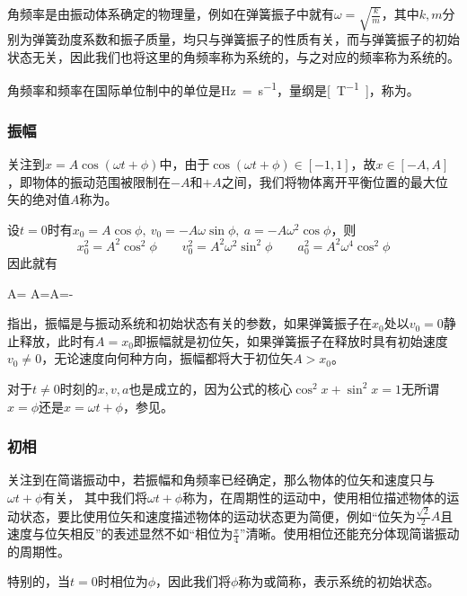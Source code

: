 角频率是由振动体系确定的物理量，例如在弹簧振子中就有$\omega=\sqrt{\frac{k}{m}}$，其中$k,m$分别为弹簧劲度系数和振子质量，均只与弹簧振子的性质有关，而与弹簧振子的初始状态无关，因此我们也将这里的角频率称为系统的，与之对应的频率称为系统的。

角频率和频率在国际单位制中的单位是\si{Hz=s^{-1}}，量纲是\si{[T^{-1}]}，称为。

\subsubsection{振幅}
关注到$x=A\cos(\omega t+\phi)$中，由于$\cos(\omega t+\phi)\in[-1,1]$，故$x\in[-A,A]$，即物体的振动范围被限制在$-A$和$+A$之间，我们将物体离开平衡位置的最大位矢的绝对值$A$称为。

设$t=0$时有$x_0=A\cos\phi,~v_0=-A\omega\sin\phi,~a=-A\omega^2\cos\phi$，则
\begin{equation*}
    x_0^2=A^2\cos^2\phi\qquad v_0^2=A^2\omega^2\sin^2\phi\qquad a_0^2=A^2\omega^4\cos^2\phi
\end{equation*}
因此就有
\begin{BoxEquation}[简谐振动的振幅]
    A=\qquad
    A=\qquad A=-
\end{BoxEquation}
指出，振幅是与振动系统和初始状态有关的参数，如果弹簧振子在$x_0$处以$v_0=0$静止释放，此时有$A=x_0$即振幅就是初位矢，如果弹簧振子在释放时具有初始速度$v_0\neq 0$，无论速度向何种方向，振幅都将大于初位矢$A>x_0$。

对于$t\neq 0$时刻的$x,v,a$也是成立的，因为公式的核心$\cos^2 x+\sin^2 x=1$无所谓$x=\phi$还是$x=\omega t+\phi$，参见。

\subsubsection{初相}
关注到在简谐振动中，若振幅和角频率已经确定，那么物体的位矢和速度只与$\omega t+\phi$有关， 其中我们将$\omega t+\phi$称为，在周期性的运动中，使用相位描述物体的运动状态，要比使用位矢和速度描述物体的运动状态更为简便，例如“位矢为$\frac{\sqrt{2}}{2}A$且速度与位矢相反”的表述显然不如“相位为$\frac{\pi}{4}$”清晰。使用相位还能充分体现简谐振动的周期性。

特别的，当$t=0$时相位为$\phi$，因此我们将$\phi$称为或简称，表示系统的初始状态。

